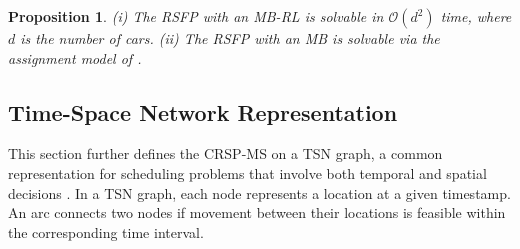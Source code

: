 \documentclass[12pt]{article}
\newtheorem{proposition}[theorem]{Proposition}
\begin{document}
\begin{proposition}\label{pro1}
    \textup{(i)} The RSFP with an MB-RL is solvable in $\mathcal{O}(d^2)$ time, where $d$ is the number of cars. \textup{(ii)} The RSFP with an MB is solvable via the assignment model of \citet{guo2025logic}.
\end{proposition}

\subsection{Time-Space Network Representation}\label{sec3-2}
This section further defines the CRSP-MS on a TSN graph, a common representation for scheduling problems that involve both temporal and spatial decisions \citep{hane1995fleet}. %
In a TSN graph, each node represents a location at a given timestamp. An arc connects two nodes if movement between their locations is feasible within the corresponding time interval.
\end{document}
